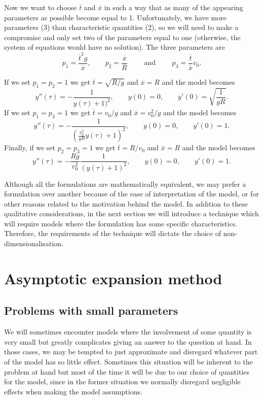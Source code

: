 Now we want to choose $\overline{t}$ and $\overline{x}$ in such a way that as
many of the appearing parameters as possible become equal to 1. Unfortunately,
we have more parameters (3) than characteristic quantities (2), so we will need
to make a compromise and only set two of the parameters equal to one
(otherwise, the system of equations would have no solution). The three
parameters are
\[
  p_1 = \frac{\overline{t}^2 g}{\overline{x}},\qquad
  p_2 = \frac{\overline{x}}{R}\qquad\text{ and }\qquad
  p_3 = \frac{\overline{t}}{\overline{x}} v_0.
\]

If we set $p_1 = p_2 = 1$ we get $\overline{t} = \sqrt{ R / g}$ and
$\overline{x} = R$ and the model becomes
\[
  y''(\tau) = - \frac{1}{y(\tau) + 1)^2},\qquad y(0) = 0,\qquad y'(0) = \sqrt{\frac{1}{gR}}.
\]
If we set $p_1 = p_3 = 1$ we get $\overline{t} = v_0 / g$ and $\overline{x} =
v_0^2 / g$ and the model becomes
\[
  y''(\tau) = - \frac{1}{(\frac{v_0^2}{gR} y(\tau) + 1)^2},\qquad
  y(0) = 0,\qquad
  y'(0) = 1.
\]
Finally, if we set $p_2 = p_3 = 1$ we get $\overline{t} = R / v_0$ and
$\overline{x} = R$ and the model becomes
\[
  y''(\tau) = -\frac{R g}{v_0^2} \frac{1}{(y(\tau) + 1)^2},\qquad
  y(0) = 0,\qquad
  y'(0) = 1.
\]

Although all the formulations are mathematically equivalent, we may prefer a
formulation over another because of the ease of interpretation of the model, or
for other reasons related to the motivation behind the model. In addition to
these qualitative considerations, in the next section we will introduce a
technique which will require models where the formulation has some specific
characteristics. Therefore, the requirements of the technique will dictate the
choice of non-dimensionalisation.


\section{Asymptotic expansion method}

\subsection{Problems with small parameters}

We will sometimes encounter models where the involvement of some quantity is
very small but greatly complicates giving an answer to the question at hand. In
those cases, we may be tempted to just approximate and disregard whatever part
of the model has so little effect. Sometimes this situation will be inherent to
the problem at hand but most of the time it will be due to our choice of
quantities for the model, since in the former situation we normally disregard
negligible effects when making the model assumptions.

